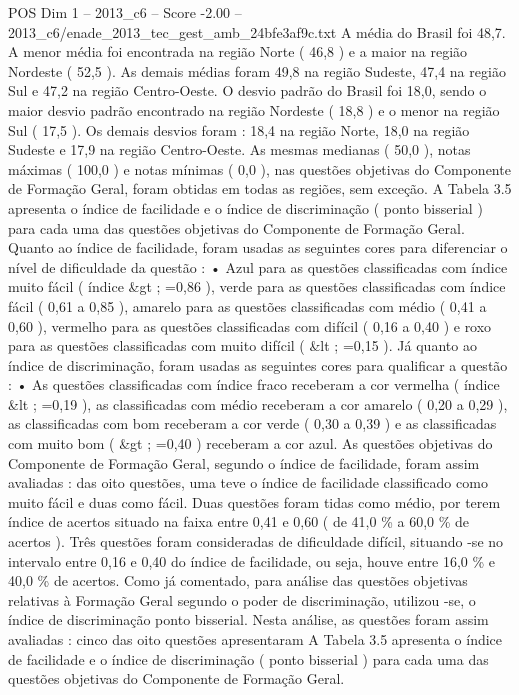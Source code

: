 \begin{textsample}{POS Dim 1 – 2013\_c6 – Score -2.00 – 2013\_c6/enade\_2013\_tec\_gest\_amb\_24bfe3af9c.txt}
A média do Brasil foi 48,7.
A menor média foi encontrada na região Norte ( 46,8 ) e a maior na região Nordeste ( 52,5 ).
As demais médias foram 49,8 na região Sudeste, 47,4 na região Sul e 47,2 na região Centro-Oeste.
O desvio padrão do Brasil foi 18,0, sendo o maior desvio padrão encontrado na região Nordeste ( 18,8 ) e o menor na região Sul ( 17,5 ).
Os demais desvios foram : 18,4 na região Norte, 18,0 na região Sudeste e 17,9 na região Centro-Oeste.
As mesmas medianas ( 50,0 ), notas máximas ( 100,0 ) e notas mínimas ( 0,0 ), nas questões objetivas do Componente de Formação Geral, foram obtidas em todas as regiões, sem exceção.
A Tabela 3.5 apresenta o índice de facilidade e o índice de discriminação ( ponto bisserial ) para cada uma das questões objetivas do Componente de Formação Geral.
Quanto ao índice de facilidade, foram usadas as seguintes cores para diferenciar o nível de dificuldade da questão : • Azul para as questões classificadas com índice muito fácil ( índice \&gt ; =0,86 ), verde para as questões classificadas com índice fácil ( 0,61 a 0,85 ), amarelo para as questões classificadas com médio ( 0,41 a 0,60 ), vermelho para as questões classificadas com difícil ( 0,16 a 0,40 ) e roxo para as questões classificadas com muito difícil ( \&lt ; =0,15 ).
Já quanto ao índice de discriminação, foram usadas as seguintes cores para qualificar a questão : • As questões classificadas com índice fraco receberam a cor vermelha ( índice \&lt ; =0,19 ), as classificadas com médio receberam a cor amarelo ( 0,20 a 0,29 ), as classificadas com bom receberam a cor verde ( 0,30 a 0,39 ) e as classificadas com muito bom ( \&gt ; =0,40 ) receberam a cor azul.
As questões objetivas do Componente de Formação Geral, segundo o índice de facilidade, foram assim avaliadas : das oito questões, uma teve o índice de facilidade classificado como muito fácil e duas como fácil.
Duas questões foram tidas como médio, por terem índice de acertos situado na faixa entre 0,41 e 0,60 ( de 41,0 \% a 60,0 \% de acertos ).
Três questões foram consideradas de dificuldade difícil, situando -se no intervalo entre 0,16 e 0,40 do índice de facilidade, ou seja, houve entre 16,0 \% e 40,0 \% de acertos.
Como já comentado, para análise das questões objetivas relativas à Formação Geral segundo o poder de discriminação, utilizou -se, o índice de discriminação ponto bisserial.
Nesta análise, as questões foram assim avaliadas : cinco das oito questões apresentaram A Tabela 3.5 apresenta o índice de facilidade e o índice de discriminação ( ponto bisserial ) para cada uma das questões objetivas do Componente de Formação Geral.

\end{textsample}
